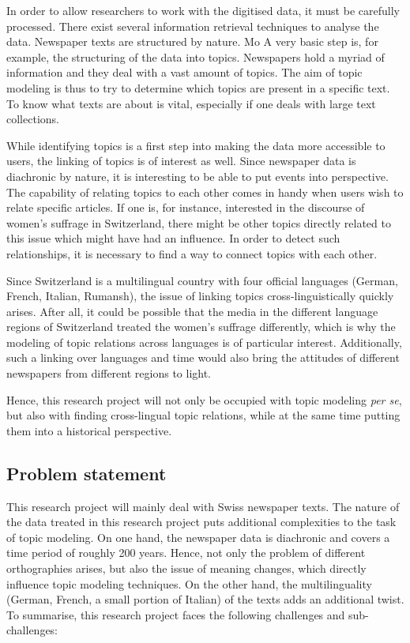 In order to allow researchers to work with the digitised data, it must be carefully processed. There exist several information retrieval techniques to analyse the data. Newspaper texts are structured by nature. Mo A very basic step is, for example, the structuring of the data into topics. Newspapers hold a myriad of information and they deal with a vast amount of topics. The aim of topic modeling is thus to try to determine which topics are present in a specific text. To know what texts are about is vital, especially if one deals with large text collections.

While identifying topics is a first step into making the data more accessible to users, the linking of topics is of interest as well. Since newspaper data is diachronic by nature, it is interesting to be able to put events into perspective. The capability of relating topics to each other comes in handy when users wish to relate specific articles. If one is, for instance, interested in the discourse of women's suffrage in Switzerland, there might be other topics directly related to this issue which might have had an influence. In order to detect such relationships, it is necessary to find a way to connect topics with each other.

Since Switzerland is a multilingual country with four official languages (German, French, Italian, Rumansh), the issue of linking topics cross-linguistically quickly arises. After all, it could be possible that the media in the different language regions of Switzerland treated the women's suffrage differently, which is why the modeling of topic relations across languages is of particular interest. Additionally, such a linking over languages and time would also bring the attitudes of different newspapers from different regions to light.

Hence, this research project will not only be occupied with topic modeling \textit{per se}, but also with finding cross-lingual topic relations, while at the same time putting them into a historical perspective.

\subsection{Problem statement}
This research project will mainly deal with Swiss newspaper texts. The nature of the data treated in this research project puts additional complexities to the task of topic modeling. On one hand, the newspaper data is diachronic and covers a time period of roughly 200 years. Hence, not only the problem of different orthographies arises, but also the issue of meaning changes, which directly influence topic modeling techniques. On the other hand, the multilinguality (German, French, a small portion of Italian) of the texts adds an additional twist. To summarise, this research project faces the following challenges and sub-challenges:

